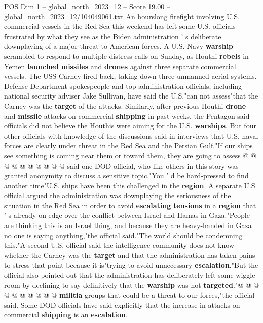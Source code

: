 \begin{textsample}{POS Dim 1 – global\_north\_2023\_12 – Score 19.00 – global\_north\_2023\_12/104049061.txt}  \label{ex:f1_pos_255}
An hourslong firefight involving U.S. commercial vessels in the Red Sea this weekend has left some U.S. officials frustrated by what they see as the Biden administration ' s deliberate downplaying of a major threat to American forces.
A U.S.
Navy \textbf{warship} scrambled to respond to multiple distress calls on Sunday, as Houthi \textbf{rebels} in Yemen \textbf{launched} \textbf{missiles} and \textbf{drones} against three separate commercial vessels.
The USS Carney fired back, taking down three unmanned aerial systems.
Defense Department spokespeople and top administration officials, including national security adviser Jake Sullivan, have said the U.S."can not assess"that the Carney was the \textbf{target} of the attacks.
Similarly, after previous Houthi \textbf{drone} and \textbf{missile} attacks on commercial \textbf{shipping} in past weeks, the Pentagon said officials did not believe the Houthis were aiming for the U.S. \textbf{warships}.
But four other officials with knowledge of the discussions said in interviews that U.S. naval forces are clearly under threat in the Red Sea and the Persian Gulf."If our ships see something is coming near them or toward them, they are going to assess @ @ @ @ @ @ @ @ @ @ said one DOD official, who like others in this story was granted anonymity to discuss a sensitive topic."You ' d be hard-pressed to find another time"U.S. ships have been this challenged in the \textbf{region}.
A separate U.S. official argued the administration was downplaying the seriousness of the situation in the Red Sea in order to avoid \textbf{escalating} \textbf{tensions} in a \textbf{region} that ' s already on edge over the conflict between Israel and Hamas in Gaza."People are thinking this is an Israel thing, and because they are heavy-handed in Gaza no one is saying anything,"the official said."The world should be condemning this."A second U.S. official said the intelligence community does not know whether the Carney was the \textbf{target} and that the administration has taken pains to stress that point because it is"trying to avoid unnecessary \textbf{escalation}."But the official also pointed out that the administration has deliberately left some wiggle room by declining to say definitively that the \textbf{warship} was not \textbf{targeted}."@ @ @ @ @ @ @ @ @ @ \textbf{militia} groups that could be a threat to our forces,"the official said.
Some DOD officials have said explicitly that the increase in attacks on commercial \textbf{shipping} is an \textbf{escalation}.

\end{textsample}
